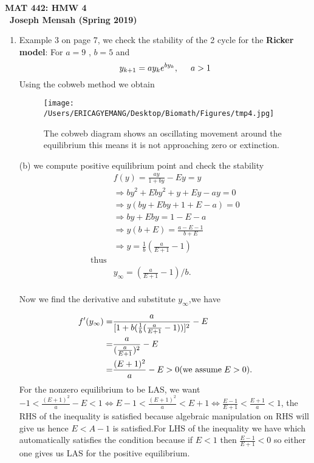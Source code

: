 \documentclass[12pt]{article}
\begin{document}
\begin{center}
\textbf{ MAT 442: HMW 4}\\
\textbf{\ Joseph Mensah (Spring 2019)}\\
\end{center}

\begin{enumerate} 
\item Example 3 on page 7, we check the stability of the 2 cycle for the \textbf{Ricker model}: For $a=9$ , $b=5$ and \[y_{k+1}=ay_ke^{by_k},  \hspace{0.5cm}a>1\]
Using the cobweb method we obtain

\begin{figure} [ht!]
 \centering
 \texttt{[image: /Users/ERICAGYEMANG/Desktop/Biomath/Figures/tmp4.jpg]} 
\caption[Figure 2.4: r>1]{The cobweb diagram shows an oscillating movement around the equilibrium this means it is not approaching zero or extinction.}
 \label{fig::model}
\end{figure}


(b) we compute positive equilibrium point and check the stability
\begin{align*}
&f(y)=\frac{ay}{1+by}-Ey=y\\
&\Rightarrow by^2+Eby^2+y+Ey-ay=0\\
&\Rightarrow y(by+Eby+1+E-a)=0\\
&\Rightarrow by+Eby=1-E-a\\
&\Rightarrow y(b+E)=\frac{a-E-1}{b+E}\\
&\Rightarrow y=\frac{1}{b}(\frac{a}{E+1}-1)\\
\mbox{thus}\\
&\boxed{y_\infty=(\frac{a}{E+1}-1)/b}.\\
\end{align*}

Now we find the derivative and substitute $y_\infty$,we have 

\begin{align*}
f'(y_\infty)=&\frac{a}{[1+b(\frac{1}{b}(\frac{a}{E+1}-1))]^2}-E\\
=&\frac{a}{(\frac{a}{E+1})^2}-E\\
=&\frac{(E+1)^2}{a}-E>0(\mbox{we assume}\hspace{0.1cm} E>0).\\
\end{align*}
For the nonzero equilibrium to be LAS, we want\\

$-1<\frac{(E+1)^2}{a}-E<1\Leftrightarrow E-1<\frac{(E+1)^2}{a}<E+1\Leftrightarrow \boxed{\frac{E-1}{E+1}<\frac{E+1}{a}<1}$,
the RHS of the inequality is satisfied because algebraic manipulation on RHS will give us  \hspace{0.1cm}\mbox{hence}\hspace{0.1cm} $E<A-1$ is satisfied.For LHS of the inequality we have  which automatically satisfies the condition because if $E<1$ then $\frac{E-1}{E+1}<0$ so either one gives us LAS for the positive equilibrium.\\


\end{enumerate}
\end{document}
